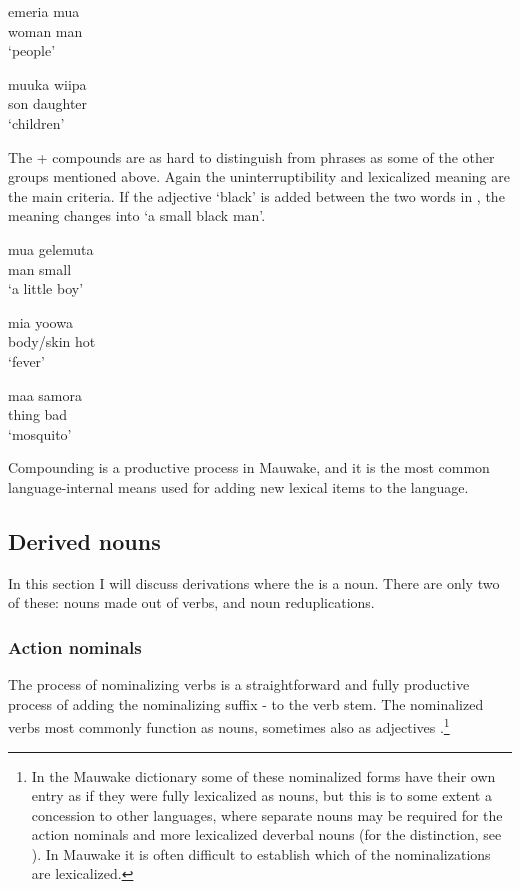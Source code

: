 \ea%
\label{ex:3:x50}
\gll emeria mua \\
woman man\\
\glt`people'
\z

\ea%
\label{ex:3:x51}
\gll muuka wiipa \\
son daughter\\
\glt`children'
\z

The + compounds are as hard to distinguish from phrases as some of the other groups mentioned above. Again the uninterruptibility and lexicalized meaning are the main criteria. If the adjective  `black' is added between the two words in , the meaning changes into `a small black man'.

\ea%
\label{ex:3:x57}
\gll mua gelemuta \\
man small\\
\glt`a little boy'
\z

\ea%
\label{ex:3:x58}
\gll mia yoowa \\
body/skin hot\\
\glt`fever'
\z

\ea%
\label{ex:3:x59}
\gll maa samora \\
thing bad\\
\glt`mosquito'
\z

Compounding is a productive process in Mauwake, and it is the most common language-internal means used for adding new lexical items to the language. 

\subsection{Derived nouns}\label{sec:3:2:6}
{}
In this section I will discuss derivations where the  is a noun. There are only two of these: nouns made out of verbs, and noun reduplications. 

\subsubsection{Action nominals}\label{sec:3.2.6.1}
{}
The process of nominalizing verbs is a straightforward and fully productive process of adding the nominalizing suffix - to the verb stem. The nominalized verbs most commonly function as nouns, sometimes also as adjectives .\footnote{In the Mauwake dictionary some of these nominalized forms have their own entry as if they were fully lexicalized as nouns, but this is to some extent a concession to other languages, where separate nouns may be required for the action nominals and more lexicalized deverbal nouns (for the distinction, see \citealt[193]{Ylikoski2003}). In Mauwake it is often difficult to establish which of the nominalizations are lexicalized.}

